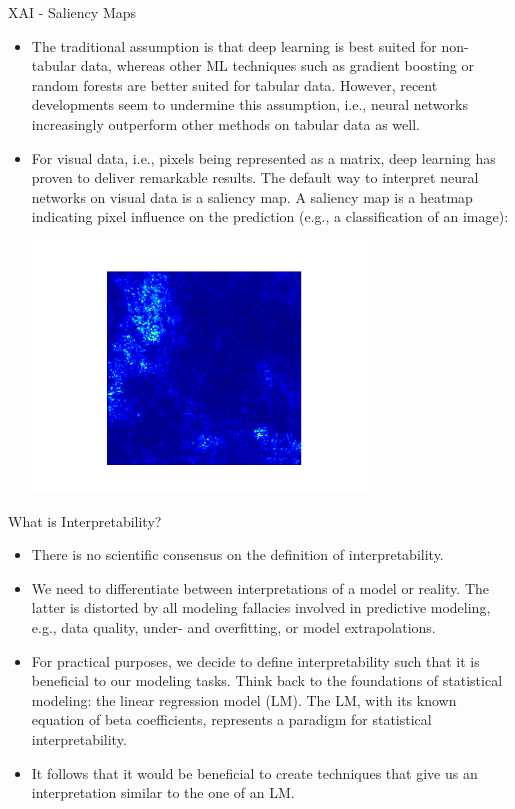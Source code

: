 \documentclass[11pt,compress,t,notes=noshow, xcolor=table]{beamer}
\begin{document}
\begin{vbframe}{XAI - Saliency Maps}
\begin{itemize}
\itemsep2em
\item The traditional assumption is that deep learning is best suited for non-tabular data, whereas other ML techniques such as gradient boosting or random forests are better suited for tabular data. However, recent developments seem to undermine this assumption, i.e., neural networks increasingly outperform other methods on tabular data as well.
\item For visual data, i.e., pixels being represented as a matrix, deep learning has proven to deliver remarkable results. The default way to interpret neural networks on visual data is a saliency map. A saliency map is a heatmap indicating pixel influence on the prediction (e.g., a classification of an image):

\includegraphics[width=0.7\textwidth]{figure/saliencymap}
\end{itemize}

\end{vbframe}

\begin{vbframe}{What is Interpretability?}
\begin{itemize}
\itemsep1em
\item There is no scientific consensus on the definition of interpretability.
\item We need to differentiate between interpretations of a model or reality. The latter is distorted by all modeling fallacies involved in predictive modeling, e.g., data quality, under- and overfitting, or model extrapolations. 
\item For practical purposes, we decide to define interpretability such that it is beneficial to our modeling tasks. Think back to the foundations of statistical modeling:  the linear regression model (LM). The LM, with its known equation of beta coefficients, represents a paradigm for statistical interpretability.
\item It follows that it would be beneficial to create techniques that give us an interpretation similar to the one of an LM.
\end{itemize}
\end{vbframe}
\end{document}
